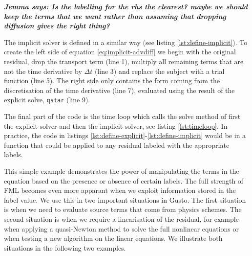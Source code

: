 \documentclass[journal abbreviation, manuscript]{copernicus}
\newcommand{\JScomment}[1]{\textit{\textbf{Jemma says: #1}}}
\begin{document}
\JScomment{Is the
  labelling for the rhs the clearest? maybe we should keep the terms
  that we want rather than assuming that dropping diffusion gives the
  right thing?}



The implicit solver is defined in a similar way (see listing
\ref{lst:define-implicit}). To create the left side of equation
\ref{eq:implicit-advdiff} we begin with the original residual, drop
the transport term (line 1), multiply all remaining terms that are not
the time derivative by $\Delta t$ (line 3) and replace the subject
with a trial function (line 5). The right side only contains the form
coming from the discretisation of the time derivative (line 7),
evaluated using the result of the explicit solve, \texttt{qstar} (line
9).



The final part of the code is the time loop which calls the solve
method of first the explicit solver and then the implicit solver, see
listing \ref{lst:timeloop}. In practice, the code in listings
\ref{lst:define-explicit}-\ref{lst:define-implicit} would be in a
function that could be applied to any residual labeled with the
appropriate labels.



This simple example demonstrates the power of manipulating the terms
in the equation based on the presence or absence of certain
labels. The full strength of FML becomes even more apparant when we
exploit information stored in the label value. We use this in two
important situations in Gusto. The first situation is when we need to
evaluate source terms that come from physics schemes. The second
situation is when we require a linearisation of the residual, for
example when applying a quasi-Newton method to solve the full
nonlinear equations or when testing a new algorithm on the linear
equations. We illustrate both situations in the following two
examples.
\end{document}
